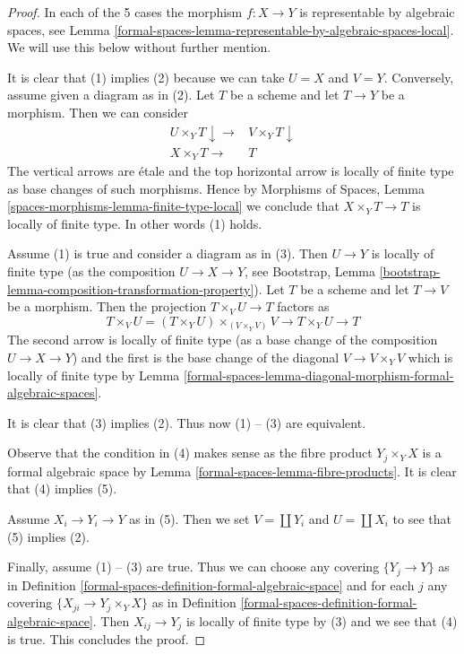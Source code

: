 \begin{proof}
In each of the 5 cases the morphism $f : X \to Y$ is representable
by algebraic spaces, see
Lemma \ref{formal-spaces-lemma-representable-by-algebraic-spaces-local}.
We will use this below without further mention.

\medskip\noindent
It is clear that (1) implies (2) because we can take $U = X$ and $V = Y$.
Conversely, assume given a diagram as in (2). Let $T$ be a scheme and
let $T \to Y$ be a morphism. Then we can consider
$$
\begin{array}{cc}U \times_Y T \downarrow\longrightarrow & V \times_Y T \downarrow \\ X \times_Y T \longrightarrow & T\end{array}
$$
The vertical arrows are \'etale and the top horizontal arrow
is locally of finite type as base changes of such morphisms.
Hence by Morphisms of Spaces, Lemma
\ref{spaces-morphisms-lemma-finite-type-local} we conclude that
$X \times_Y T \to T$ is locally of finite type. In other words
(1) holds.

\medskip\noindent
Assume (1) is true and consider a diagram as in (3).
Then $U \to Y$ is locally of finite type
(as the composition $U \to X \to Y$, see
Bootstrap, Lemma \ref{bootstrap-lemma-composition-transformation-property}).
Let $T$ be a scheme and let $T \to V$ be a morphism.
Then the projection $T \times_V U \to T$ factors as
$$
T \times_V U = (T \times_Y U) \times_{(V \times_Y V)} V
\to T \times_Y U \to T
$$
The second arrow is locally of finite type (as a base change
of the composition $U \to X \to Y$) and
the first is the base change of the diagonal $V \to V \times_Y V$
which is locally of finite type by
Lemma \ref{formal-spaces-lemma-diagonal-morphism-formal-algebraic-spaces}.

\medskip\noindent
It is clear that (3) implies (2). Thus now (1) -- (3) are equivalent.

\medskip\noindent
Observe that the condition in (4) makes sense as the fibre product
$Y_j \times_Y X$ is a formal algebraic space by
Lemma \ref{formal-spaces-lemma-fibre-products}.
It is clear that (4) implies (5).

\medskip\noindent
Assume $X_i \to Y_i \to Y$ as in (5). Then we set
$V = \coprod Y_i$ and $U = \coprod X_i$ to see that
(5) implies (2).

\medskip\noindent
Finally, assume (1) -- (3) are true.
Thus we can choose any covering $\{Y_j \to Y\}$ as in
Definition \ref{formal-spaces-definition-formal-algebraic-space}
and for each $j$ any covering $\{X_{ji} \to Y_j \times_Y X\}$ as in
Definition \ref{formal-spaces-definition-formal-algebraic-space}.
Then $X_{ij} \to Y_j$ is locally of finite type by (3)
and we see that (4) is true. This concludes the proof.
\end{proof}

